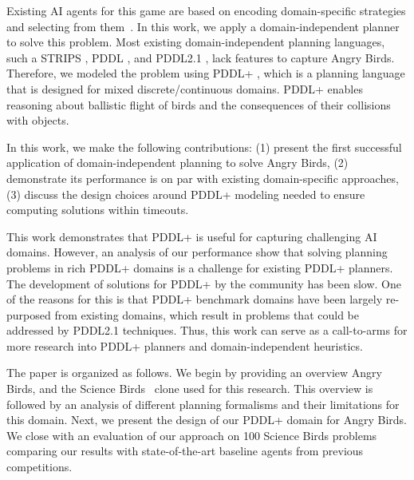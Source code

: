 Existing AI agents for this game are based on encoding domain-specific strategies and selecting from them~\cite{borovicka2014datalab,wang2017description}. 
In this work, we apply a domain-independent planner to solve this problem. 
Most existing domain-independent planning languages, such a STRIPS \cite{fikes1971strips}, PDDL \cite{mcdermott1998pddl}, and PDDL2.1 \cite{fox2003pddl2}, lack features to capture Angry Birds. 
Therefore, we modeled the problem using PDDL+ \cite{fox2006modelling}, which is a planning language that is designed for mixed discrete/continuous domains. PDDL+ enables reasoning about ballistic flight of birds and the consequences of their collisions with objects.

 


In this work, we make the following contributions: 
(1) present the first successful application of domain-independent planning to solve Angry Birds,  (2) demonstrate its performance is on par with existing domain-specific approaches, 
(3) discuss the design choices around PDDL+ modeling needed to ensure computing solutions within timeouts. 


This work demonstrates that PDDL+ is useful for capturing challenging AI domains. 
However, an analysis of our performance show that solving planning problems in rich PDDL+ domains is a challenge for existing PDDL+ planners. The development of solutions for PDDL+ by the community has been slow. One of the reasons for this is that PDDL+ benchmark domains have been largely re-purposed from existing domains, which result in problems that could be addressed by PDDL2.1 techniques. 
Thus, this work can serve as a call-to-arms for more research into PDDL+ planners and domain-independent heuristics. 



The paper is organized as follows. We begin by providing an overview Angry Birds, and the Science Birds~\cite{renz2015aibirds} clone used for this research. This overview is followed by an analysis of different planning formalisms and their limitations for this domain. Next, we present the design of our PDDL+ domain for Angry Birds. We close with an evaluation of our approach on 100 Science Birds problems comparing our results with state-of-the-art baseline agents from previous competitions. %

